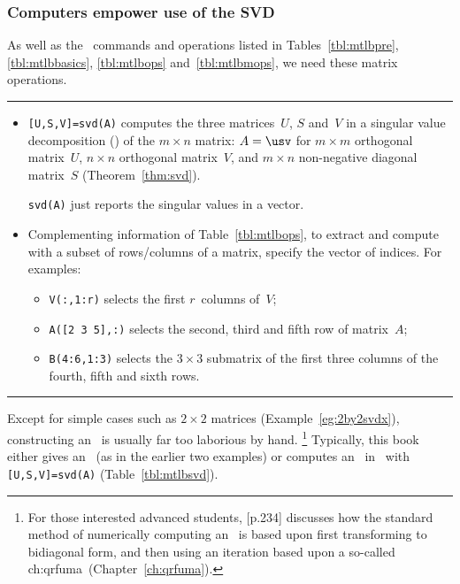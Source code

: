 \subsubsection{Computers empower use of the SVD}

\begin{table}
\caption{As well as the \script\ commands and operations listed in Tables~\ref{tbl:mtlbpre}, \ref{tbl:mtlbbasics}, \ref{tbl:mtlbops} and~\ref{tbl:mtlbmops},  we need these matrix operations.} \label{tbl:mtlbsvd}
\hrule
\begin{minipage}{\linewidth}
\begin{itemize}
\item {}\verb|[U,S,V]=svd(A)| computes the three matrices~\(U\), \(S\) and~\(V\) in a singular value decomposition (\svd) of the \(m\times n\) matrix: \(A=\usv\) for \(m\times m\) orthogonal matrix~\(U\), \(n\times n\) orthogonal matrix~\(V\), and \(m\times n\) non-negative diagonal matrix~\(S\) (Theorem~\ref{thm:svd}).

\verb|svd(A)| just reports the singular values in a vector.

\item Complementing information of Table~\ref{tbl:mtlbops}, to extract and compute with a subset of rows\slash columns of a matrix, specify the vector of indices.
For examples:
\begin{itemize}
\item \verb|V(:,1:r)| selects the first \(r\)~columns of~\(V\);
\item \verb|A([2 3 5],:)| selects the second, third and fifth row of matrix~\(A\);
\item \verb|B(4:6,1:3)| selects the \(3\times 3\) submatrix of the first three columns of the fourth, fifth and sixth rows.
\end{itemize}

\end{itemize}
\end{minipage}
\hrule
\end{table}




Except for simple cases such as \(2\times 2\) matrices (Example~\ref{eg:2by2svdx}), constructing an \svd\ is usually far too laborious by hand.  
\footnote{For those interested advanced students, \cite{Trefethen1997} [p.234] discusses how the standard method of numerically computing an \svd\ is based upon first transforming to bidiagonal form, and then using an iteration based upon a so-called  \ifcsname ch:qrfuma\endcsname\ (Chapter~\ref{ch:qrfuma})\fi.}
Typically, this book either gives an \svd\ (as in the earlier two examples) or computes an \svd\ in \script\ with \verb|[U,S,V]=svd(A)| (Table~\ref{tbl:mtlbsvd}).

